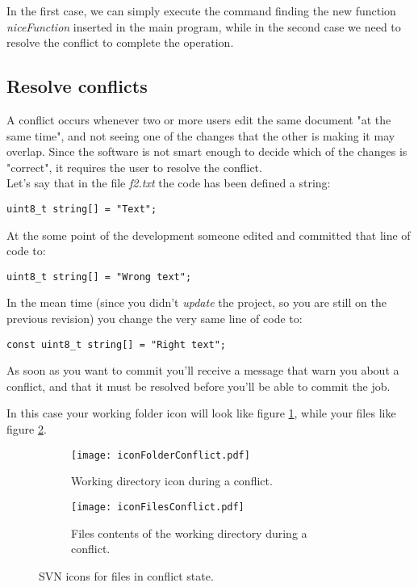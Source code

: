 In the first case, we can simply execute the command finding the new function \textit{niceFunction} inserted in the main program, while in the second case we need to resolve the conflict to complete the operation.\\


\subsection{Resolve conflicts}
\label{subsection:ResolveConflicts}


A conflict occurs whenever two or more users edit the same document "at the same time", and not seeing one of the changes that the other is making it may overlap. Since the software is not smart enough to decide which of the changes is "correct", it requires the user to resolve the conflict.\\

Let's say that in the file \textit{f2.txt} the code has been defined a string: \begin{verbatim}uint8_t string[] = "Text";\end{verbatim}

At the some point of the development someone edited and committed that line of code to:

\begin{verbatim}uint8_t string[] = "Wrong text";\end{verbatim}

In the mean time (since you didn't \textit{update} the project, so you are still on the previous revision) you change the very same line of code to:

\begin{verbatim}const uint8_t string[] = "Right text";\end{verbatim}

As soon as you want to commit you'll receive a message that warn you about a conflict, and that it must be resolved before you'll be able to commit the job.

In this case your working folder icon will look like figure \ref{fig:iconFolderConflict}, while your files like figure \ref{fig:iconFileConflict}.\\


\begin{figure}[htbp]
\begin{subfigure}{0.5\textwidth}
  \centering
  \texttt{[image: iconFolderConflict.pdf]}
  \caption{Working directory icon during a conflict.}
  \label{fig:iconFolderConflict}
\end{subfigure}%
\begin{subfigure}{0.5\textwidth}
  \centering
  \texttt{[image: iconFilesConflict.pdf]}
  \caption{Files contents of the working directory during a conflict.}
  \label{fig:iconFileConflict}
\end{subfigure}
\caption{SVN icons for files in conflict state.}
\label{fig:systemIcons_4}
\end{figure}

